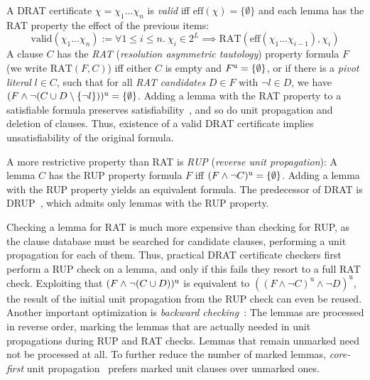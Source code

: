 \documentclass[smallcondensed]{svjour3}     %
\begin{document}
A DRAT certificate $\chi = \chi_1\ldots\chi_n$ is \emph{valid} iff $\textrm{eff}(\chi) = \{\emptyset\}$ and each lemma has the RAT property \wrt the effect of the previous items:
\[
  \textrm{valid}(\chi_1 \ldots \chi_n) := \forall 1\le i\le n.~\chi_i\in2^L \implies\textrm{RAT}( \textrm{eff}(\chi_1\ldots \chi_{i-1}), \chi_i )
\]
A clause $C$ has the \emph{RAT} (\emph{resolution asymmetric tautology}) property \wrt formula $F$ (we write $\textrm{RAT}(F,C)$) iff either $C$ is empty and $F^{\textrm u}=\{\emptyset\}$,
or if there is a \emph{pivot literal} $l\in C$, such that for all \emph{RAT candidates} $D\in F$ with $\neg l \in D$, we have $(F \wedge \neg(C \cup D\setminus\{\neg l\}))^{\textrm u} = \{\emptyset\}$.
Adding a lemma with the RAT property to a satisfiable formula preserves satisfiability~\cite{WHH13}, and so do unit propagation and deletion of clauses. Thus, existence of a valid DRAT certificate implies unsatisfiability of the original formula.


A more restrictive property than RAT is \emph{RUP} (\emph{reverse unit propagation}): A lemma $C$ has the RUP property \wrt formula $F$ iff $(F \wedge \neg C)^{\textrm u} = \{\emptyset\}$.
Adding a lemma with the RUP property yields an equivalent formula. The predecessor of DRAT is DRUP~\cite{HHW13}, which admits only lemmas with the RUP property.

Checking a lemma for RAT is much more expensive than checking for RUP, as the clause database must be searched for candidate clauses,
performing a unit propagation for each of them. Thus, practical DRAT certificate checkers first perform a RUP check on a lemma, and only if 
this fails they resort to a full RAT check. Exploiting that $(F\wedge\neg(C\cup D))^\textrm{u}$ is equivalent to $((F \wedge \neg C)^\textrm{u} \wedge \neg D)^\textrm{u}$,
the result of the initial unit propagation from the RUP check can even be reused.
Another important optimization is \emph{backward checking}~\cite{GoNo03,HHW13}: The lemmas are processed in reverse order, marking the lemmas that are actually needed 
in unit propagations during RUP and RAT checks. Lemmas that remain unmarked need not be processed at all. To further reduce the number of marked lemmas, 
\emph{core-first} unit propagation~\cite{WHH14} prefers marked unit clauses over unmarked ones.
\end{document}
